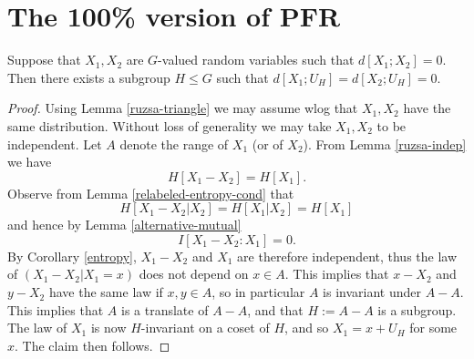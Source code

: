 \chapter{The 100\% version of PFR}

\begin{lemma}\label{lem:100pc}
  Suppose that $X_1,X_2$ are $G$-valued random variables such that
  $d[X_1;X_2]=0$. Then there exists a subgroup $H \leq G$ such that $d[X_1;U_H] = d[X_2;U_H] = 0$.
\end{lemma}

\begin{proof}
Using Lemma \ref{ruzsa-triangle} we may assume wlog that $X_1,X_2$ have the same distribution.
   Without loss of generality we may take $X_1,X_2$ to be independent.  Let $A$ denote the range of $X_1$ (or of $X_2$).  From Lemma \ref{ruzsa-indep} we have
  $$ H[X_1-X_2] = H[X_1].$$
Observe from Lemma \ref{relabeled-entropy-cond} that
$$ H[X_1-X_2|X_2] = H[X_1|X_2] = H[X_1]$$
and hence by Lemma \ref{alternative-mutual}
$$ I[ X_1-X_2 : X_1 ] = 0.$$
By Corollary \ref{entropy}, $X_1-X_2$ and $X_1$ are therefore independent, thus the law of $(X_1-X_2|X_1=x)$ does not depend on $x \in A$.  This implies that $x-X_2$ and $y-X_2$ have the same law if $x,y \in A$, so in particular $A$ is invariant under $A-A$.  This implies that $A$ is a translate of $A-A$, and that $H := A-A$ is a subgroup.  The law of $X_1$ is now $H$-invariant on a coset of $H$, and so $X_1 = x + U_H$ for some $x$.  The claim then follows.
\end{proof}
